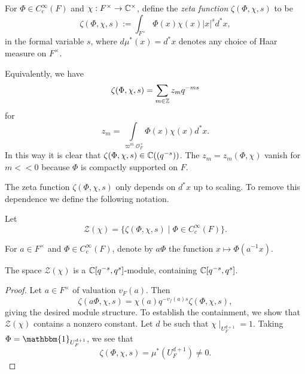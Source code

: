 \begin{defn}
    For $\Phi \in C_c^\infty(F)$ and $\chi :F^\times \to \mathbb{C}^\times$, define the \textit{zeta function} $\zeta(\Phi,\chi,s)$ to be
    $$\zeta(\Phi,\chi,s) := \int_{F^\times} \Phi(x)\chi(x)|x|^s d^*x,$$ in the formal variable $s$, where $d\mu^*(x) = d^*x$ denotes any choice of Haar measure on $F^\times$.
\end{defn}

Equivalently, we have
$$\zeta(\Phi,\chi,s) = \sum\limits_{m \in \mathbb{Z}} z_m q^{-ms}$$
for $$z_m = \int\limits_{\varpi^m \mathcal O_F^\times} \Phi(x)\chi(x)d^*x.$$ In this way it is clear that $\zeta(\Phi,\chi,s) \in \mathbb{C}((q^{-s}))$. The $z_m=z_m(\Phi,\chi)$ vanish for $m <<0$ because $\Phi$ is compactly supported on $F$.

The zeta function $\zeta(\Phi,\chi,s)$ only depends on $d^*x$ up to scaling. To remove this dependence we define the following notation.

\begin{notn}
    Let $$\mathcal Z(\chi) = \{\zeta(\Phi,\chi,s) \mid \Phi \in C_c^\infty(F)\}.$$
\end{notn}

\begin{notn}
    For $a \in F^\times$ and $\Phi \in C_c^\infty(F)$, denote by $a\Phi$ the function $x \mapsto \Phi(a^{-1}x)$.
\end{notn}

\begin{lemma}
    The space $\mathcal Z(\chi)$ is a $\mathbb{C}[q^{-s},q^s]$-module, containing $\mathbb{C}[q^{-s},q^s]$.
\end{lemma}
\begin{proof}
    Let $a \in F^\times$ of valuation $v_F(a)$. Then 
    $$\zeta(a\Phi,\chi,s) = \chi(a)q^{-v_f(a)s}\zeta(\Phi,\chi,s),$$ giving the desired module structure. To establish the containment, we show that $\mathcal Z(\chi)$ contains a nonzero constant. Let $d$ be such that $\chi \mid_{U_F^{d+1}} = 1$. Taking $\Phi=\mathbbm{1}_{U_F^{d+1}}$, we see that 
    $$\zeta(\Phi,\chi,s) = \mu^*(U_F^{d+1}) \neq 0.$$
\end{proof}

